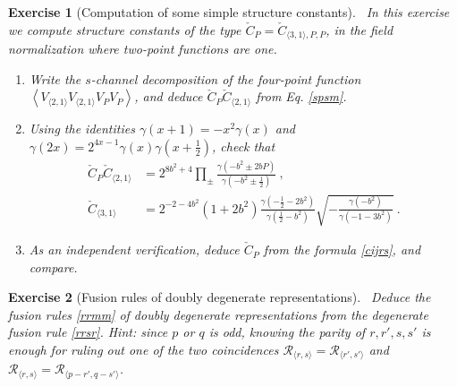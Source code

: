 \documentclass[12pt, a4paper, notitlepage, twoside]{report}
\numberwithin{equation}{section}
\theoremstyle{break}
\newtheorem{exo}{Exercise}[chapter]
\begin{document}
\begin{exo}[Computation of some simple structure constants]
 ~\label{exosssc}
 In this exercise we compute structure constants of the type $\check{C}_P = \check{C}_{\langle 3,1\rangle, P,P}$, in the field normalization where two-point functions are one. 
\begin{enumerate}
\item Write the $s$-channel decomposition of the four-point function $\left< V_{\langle 2,1\rangle} V_{\langle 2,1\rangle} V_PV_P\right>$, and deduce $\check{C}_P \check{C}_{\langle 2,1\rangle}$ from Eq. \eqref{spsm}.
\item Using the identities $\gamma(x+1)=-x^2\gamma(x)$ and $\gamma(2x)= 2^{4x-1}\gamma(x)\gamma(x+\tfrac12)$, check that
\begin{align}
 \check{C}_P \check{C}_{\langle 2,1\rangle} &= 2^{8b^2+4} \prod_\pm \frac{\gamma(-b^2\pm 2bP)}{\gamma(-b^2\pm \frac12)} \ ,
 \\
 \check{C}_{\langle 3,1\rangle} &= 2^{-2-4b^2}(1+2b^2)\frac{\gamma(-\tfrac12-2b^2)}{\gamma(\tfrac12-b^2)}\sqrt{-\frac{\gamma(-b^2)}{\gamma(-1-3b^2)}}\ .
 \label{cto}
\end{align}
 \item As an independent verification, deduce $\check{C}_P$ from the formula \eqref{cijrs}, and compare.
\end{enumerate}
\end{exo}

 
\begin{exo}[Fusion rules of doubly degenerate representations]
 ~\label{exofus}
Deduce the fusion rules \eqref{rrmm} of doubly degenerate representations from the degenerate fusion rule \eqref{rrsr}. 
Hint: since $p$ or $q$ is odd, knowing the parity of $r, r', s, s'$ is enough for ruling out one of the two coincidences $\mathcal{R}_{\langle r,s\rangle} = \mathcal{R}_{\langle r',s'\rangle}$ and $\mathcal{R}_{\langle r,s\rangle} = \mathcal{R}_{\langle p-r',q-s'\rangle}$.
\end{exo}
\end{document}
